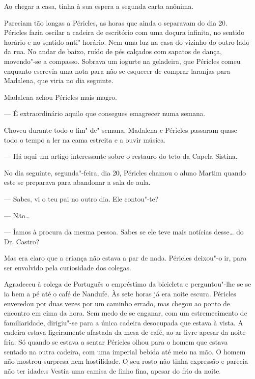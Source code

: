 Ao chegar a casa, tinha à sua espera a segunda carta anônima.

\begin{quotation}
\end{quotation}

Pareciam tão longas a Péricles, as horas que ainda o separavam do dia
20. Péricles fazia oscilar a cadeira de escritório com uma doçura
infinita, no sentido horário e no sentido anti"-horário. Nem uma luz na casa do vizinho do outro lado da rua. No andar
de baixo, ruído de pés calçados com sapatos de dança, movendo"-se a
compasso. Sobrava um iogurte na geladeira, que Péricles comeu
enquanto escrevia uma nota para não se esquecer de comprar laranjas para
Madalena, que viria no dia seguinte.

Madalena achou Péricles mais magro.

--- É extraordinário aquilo que consegues emagrecer numa semana.


Choveu durante todo o fim"-de"-semana. Madalena e Péricles passaram quase
todo o tempo a ler na cama estreita e a ouvir música.

--- Há aqui um artigo interessante sobre o restauro do teto da Capela Sistina.


No dia seguinte, segunda"-feira, dia 20, Péricles chamou o aluno Martim
quando este se preparava para abandonar a sala de aula.

--- Sabes, vi o teu pai no outro dia. Ele contou"-te?

--- Não\ldots{}

--- Íamos à procura da mesma pessoa. Sabes se ele teve mais notícias
desse\ldots{} do Dr. Castro?

Mas era claro que a criança não estava a par de nada. Péricles deixou"-o
ir, para ser envolvido pela curiosidade dos colegas.

Agradeceu à colega de Português o empréstimo da bicicleta e
perguntou"-lhe se se ia bem a pé até o café de Nandufe. Às sete horas já
era noite escura. Péricles enveredou por duas vezes por um caminho
errado, mas chegou ao ponto de encontro em cima da hora. Sem medo de se
enganar, com um estremecimento de familiaridade, dirigiu"-se para a única
cadeira desocupada que estava à vista. A cadeira estava ligeiramente
afastada da mesa de café, ao ar livre apesar da noite fria. Só quando se
estava a sentar Péricles olhou para o homem que estava sentado na outra
cadeira, com uma imperial bebida até meio na mão. O homem não mostrou
surpresa nem hostilidade. O seu rosto não tinha expressão e parecia
não ter idade.s
Vestia uma camisa de linho fina, apesar do frio da noite.

